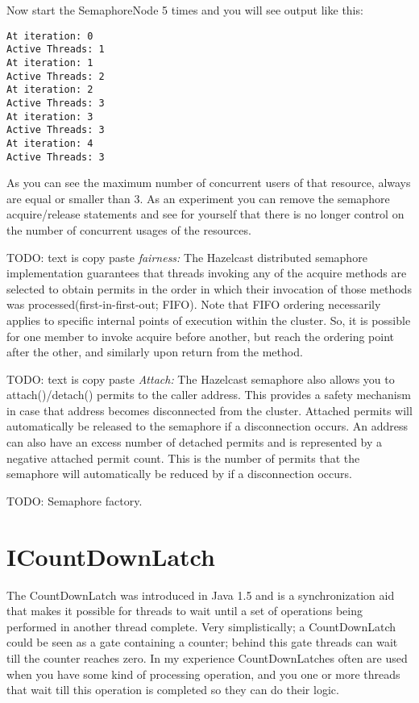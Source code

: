 Now start the SemaphoreNode 5 times and you will see output like this:
\begin{verbatim}
At iteration: 0
Active Threads: 1
At iteration: 1
Active Threads: 2
At iteration: 2
Active Threads: 3
At iteration: 3
Active Threads: 3
At iteration: 4
Active Threads: 3
\end{verbatim}
As you can see the maximum number of concurrent users of that resource, always are equal or smaller than 3. As an experiment you can remove the semaphore acquire/release statements and see for yourself that there is no longer control on the number of concurrent usages of the resources.

TODO: text is copy paste
\emph{fairness:} The Hazelcast distributed semaphore implementation guarantees that threads invoking any of the acquire methods are selected to obtain permits in the order in which their invocation of those methods was processed(first-in-first-out; FIFO). Note that FIFO ordering necessarily applies to specific internal points of execution within the cluster. So, it is possible for one member to invoke acquire before another, but reach the ordering point after the other, and similarly upon return from the method.

TODO: text is copy paste
\emph{Attach:} The Hazelcast semaphore also allows you to attach()/detach() permits to the caller address. This provides a safety mechanism in case that address becomes disconnected from the cluster. Attached permits will automatically be released to the semaphore if a disconnection occurs. An address can also have an excess number of detached permits and is represented by a negative attached permit count. This is the number of permits that the semaphore will automatically be reduced by if a disconnection occurs.

TODO: Semaphore factory.

\section{ICountDownLatch}
The CountDownLatch was introduced in Java 1.5 and is a synchronization aid that makes it possible for threads to wait until a set of operations being performed in another thread  complete. Very simplistically; a CountDownLatch could be seen as a gate containing a counter; behind this gate threads can wait till the counter reaches zero. In my experience CountDownLatches often are used when you have some kind of processing operation, and you one or more threads that wait till this operation is completed so they can do their logic.

